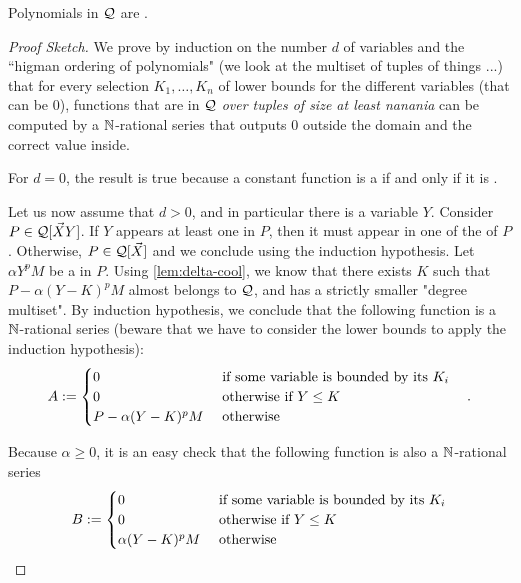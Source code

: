 \documentclass[a4paper,11pt]{article}
\begin{document}
\begin{lemma}
    \label{lem:correct-to-n-rat}
    Polynomials in $\mathcal{Q}$ are
    .
\end{lemma}
\begin{proof}[Proof Sketch]
    We prove by induction on the number $d$ of variables
    and the ``higman ordering of polynomials" (we look at the multiset
    of tuples of things ...) that for every selection
    $K_1, \dots, K_n$ of lower bounds for the different variables
    (that can be $0$),
    functions that are in $\mathcal{Q}$ \emph{over tuples of size
    at least nanania} can be computed by a $\mathbb{N}$-rational series
    that outputs $0$ outside the domain and the correct value
    inside.

    For $d = 0$,
    the result is true because
    a constant function is a 
    if and only if it is .

    Let us now assume that $d > 0$, and in particular
    there is a variable $Y$.
    Consider $P \in \mathcal{Q}[\vec{X} Y]$.
    If $Y$ appears at least one in $P$, then it must appear
    in one of the  of $P$. Otherwise,
    $P \in \mathcal{Q}[\vec{X}]$ and we conclude using the
    induction hypothesis.
    Let $\alpha Y^p M$ be a  in $P$.
    Using \cref{lem:delta-cool},
    we know that there exists $K$ such that
    $P - \alpha (Y - K)^p M$ almost belongs to $\mathcal{Q}$,
    and has a strictly smaller "degree multiset".
    By induction hypothesis,
    we conclude that
    the following function is a $\mathbb{N}$-rational series
    (beware that we have to consider the lower bounds to apply
    the induction hypothesis):
    \begin{equation*}
        A \mathrel{:=}
        \begin{cases}
            0 & \text{ if some variable is bounded by its } K_i \\
            0 & \text{ otherwise if  } Y \leq K \\
            P - \alpha(Y - K)^pM & \text{ otherwise }
        \end{cases}
        \quad .
    \end{equation*}

    Because $\alpha \geq 0$, it is an easy check
    that the following function is also a $\mathbb{N}$-rational series
    \begin{equation*}
        B \mathrel{:=}
        \begin{cases}
            0 & \text{ if some variable is bounded by its } K_i \\
            0 & \text{ otherwise if } Y \leq K \\
            \alpha(Y - K)^pM & \text{ otherwise }
        \end{cases}
    \end{equation*}


\end{proof}
\end{document}
